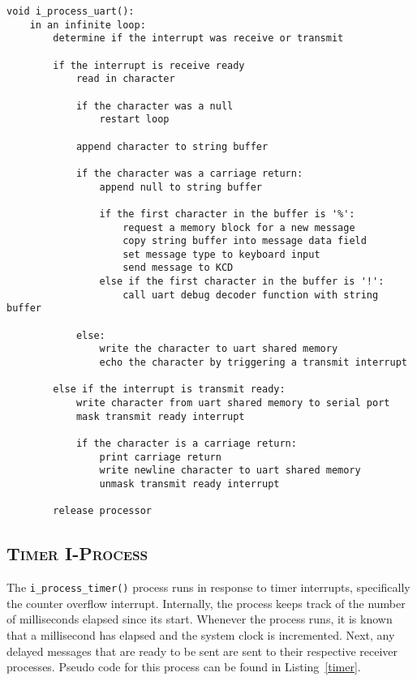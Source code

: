 \documentclass[oneside]{report}
\begin{document}
\begin{lstlisting}
void i_process_uart():
    in an infinite loop:
        determine if the interrupt was receive or transmit

        if the interrupt is receive ready
            read in character

            if the character was a null
                restart loop

            append character to string buffer
            
            if the character was a carriage return:
                append null to string buffer
                
                if the first character in the buffer is '%':
                    request a memory block for a new message
                    copy string buffer into message data field
                    set message type to keyboard input
                    send message to KCD
                else if the first character in the buffer is '!':
                    call uart debug decoder function with string buffer        

            else:
                write the character to uart shared memory
                echo the character by triggering a transmit interrupt

        else if the interrupt is transmit ready:
            write character from uart shared memory to serial port
            mask transmit ready interrupt
            
            if the character is a carriage return:
                print carriage return
                write newline character to uart shared memory
                unmask transmit ready interrupt
            
        release processor
\end{lstlisting}

\subsection{\textsc{Timer I-Process}}

The \texttt{i\_process\_timer()} process runs in response to timer
interrupts, specifically the counter overflow interrupt. Internally,
the process keeps track of the number of milliseconds elapsed since
its start. Whenever the process runs, it is known that a millisecond
has elapsed and the system clock is incremented. Next, any delayed
messages that are ready to be sent are sent to their respective
receiver processes. Pseudo code for this process can be found in
Listing~\ref{timer}.
\end{document}
